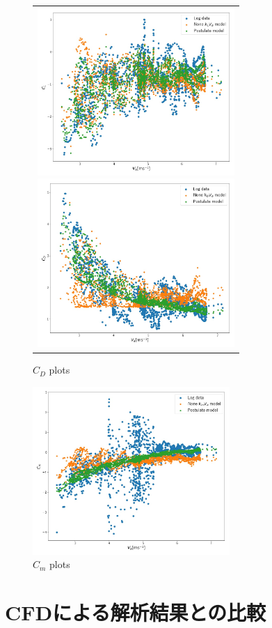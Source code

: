 \begin{figure}[htbp]
	\begin{center}
		\begin{tabular}{c}
			\begin{minipage}{0.5\hsize}
				\begin{center}
					\includegraphics[clip,width=7.5cm,bb=0 0 982 835]{./z_figure_files/chapter5/2_CL.jpeg}
					\caption{$C_L$ plots}
					\label{fig:CL_si}
				\end{center}
			\end{minipage}
			\begin{minipage}{0.5\hsize}
				\begin{center}
					\includegraphics[clip,width=7.5cm,bb=0 0 982 835]{./z_figure_files/chapter5/3_CD.jpeg}
					\caption{$C_D$ plots}
					\label{fig:CD_si}
				\end{center}
			\end{minipage}
		\end{tabular}
	\end{center}
\end{figure}
\begin{figure}[H]
  \begin{center}
    \includegraphics[clip,width=7.5cm,bb=0 0 982 835]{./z_figure_files/chapter5/4_Cm.jpeg}
    \caption{$C_m$ plots}
    \label{fig:Cm_si}
  \end{center}
\end{figure}


\section{CFDによる解析結果との比較}
